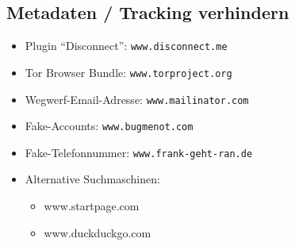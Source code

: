 \documentclass[a5paper]{scrartcl}
\begin{document}
\subsection*{Metadaten / Tracking verhindern}
\begin{itemize}
  \item Plugin ``Disconnect'': \texttt{www.disconnect.me}
  \item Tor Browser Bundle: \texttt{www.torproject.org}
  \item Wegwerf-Email-Adresse: \texttt{www.mailinator.com}
  \item Fake-Accounts: \texttt{www.bugmenot.com}
  \item Fake-Telefonnummer: \texttt{www.frank-geht-ran.de}
  \item Alternative Suchmaschinen: 
    \begin{itemize}
      \item www.startpage.com 
      \item www.duckduckgo.com
    \end{itemize}
\end{itemize}
\end{document}
